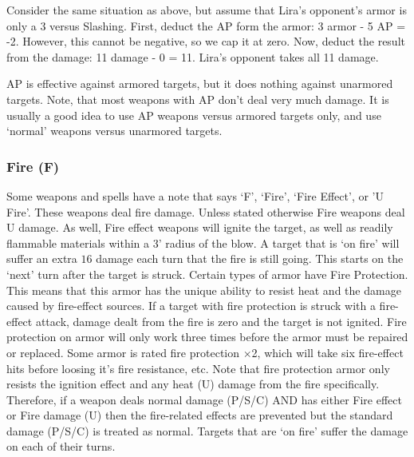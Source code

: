 \documentclass[twoside]{book}
\begin{document}
  
    {  
      Consider the same situation as above, but assume
                 that Lira's opponent's armor is only a 3
                 versus Slashing. First, deduct the AP form the armor: 3
                 armor - 5 AP = -2. However, this cannot be negative, so
                 we cap it at zero. Now, deduct the result from the
                 damage: 11 damage - 0 = 11. Lira's opponent takes
                 all 11 damage. 
    }
  
    {  
     AP is effective against armored targets, but it
                 does nothing against unarmored targets. Note, that most
                 weapons with AP don't deal very much damage. It is
                 usually a good idea to use AP weapons versus armored
                 targets only, and use `normal' weapons
                 versus unarmored targets. 
    }
  
    

\subsubsection{Fire (F)}
    
    {  
     Some weapons and spells have a note that says
                 `F', `Fire', `Fire
                 Effect', or 'U Fire'. These weapons
                 deal fire damage. Unless stated otherwise Fire weapons
                 deal U damage. As well, Fire effect weapons will ignite
                 the target, as well as readily flammable materials
                 within a 3' radius of the blow. A target that is
                 `on fire' will suffer an extra \ensuremath{1}\ensuremath{6}\ensuremath{} damage
                 each turn that the fire is still going. This starts on
                 the `next' turn after the target is struck.
                 Certain types of armor have Fire Protection. This means
                 that this armor has the unique ability to resist heat
                 and the damage caused by fire-effect sources. If a
                 target with fire protection is struck with a fire-effect
                 attack, damage dealt from the fire is zero and the
                 target is not ignited. Fire protection on armor will
                 only work three times before the armor must be repaired
                 or replaced. Some armor is rated fire protection
                 \begin{math}\times \end{math}2, which will take six
                 fire-effect hits before loosing it's fire
                 resistance, etc. Note that fire protection armor only
                 resists the ignition effect and any heat (U) damage
                 from the fire specifically.  Therefore, if a weapon
                 deals normal damage (P/S/C) AND has either Fire
                 effect or Fire damage (U) then the fire-related
                 effects are prevented but the standard damage (P/S/C)
                 is treated as normal. Targets that are `on
                 fire' suffer the damage on each of their
                 turns. 
    }
  
\end{document}
